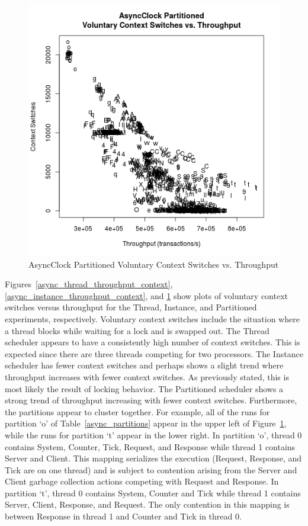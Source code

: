\begin{figure}[H]
\center
\includegraphics[height=.4\textheight]{async_partitioned_throughput_context.png}
\caption{AsyncClock Partitioned Voluntary Context Switches vs. Throughput}
\label{async_partitioned_throughput_context}
\end{figure}

Figures~\ref{async_thread_throughput_context}, \ref{async_instance_throughput_context}, and \ref{async_partitioned_throughput_context} show plots of voluntary context switches versus throughput for the Thread, Instance, and Partitioned experiments, respectively.
Voluntary context switches include the situation where a thread blocks while waiting for a lock and is swapped out.
The Thread scheduler appears to have a consistently high number of context switches.
This is expected since there are three threads competing for two processors.
The Instance scheduler has fewer context switches and perhaps shows a slight trend where throughput increases with fewer context switches.
As previously stated, this is most likely the result of locking behavior.
The Partitioned scheduler shows a strong trend of throughput increasing with fewer context switches.
Furthermore, the partitions appear to cluster together.
For example, all of the runs for partition `o' of Table~\ref{async_partitions} appear in the upper left of Figure~\ref{async_partitioned_throughput_context}, while the runs for partition `t' appear in the lower right.
In partition `o', thread 0 contains System, Counter, Tick, Request, and Response while thread 1 contains Server and Client.
This mapping serializes the execution (Request, Response, and Tick are on one thread) and is subject to contention arising from the Server and Client garbage collection actions competing with Request and Response.
In partition `t', thread 0 contains System, Counter and Tick while thread 1 contains Server, Client, Response, and Request.
The only contention in this mapping is between Response in thread 1 and Counter and Tick in thread 0.

